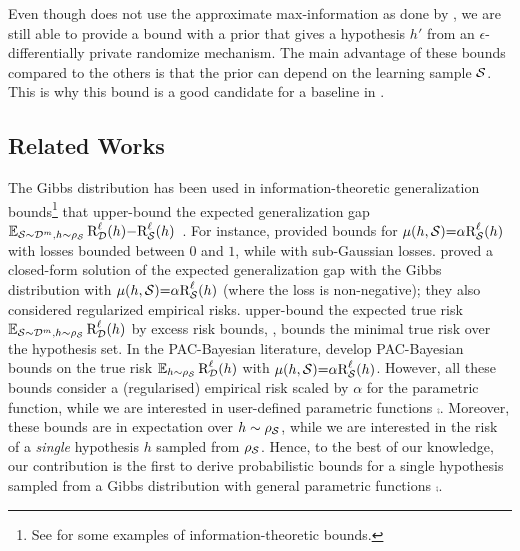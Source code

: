 \documentclass[twoside]{article}
\theoremstyle{plain}
\begin{document}
Even though  does not use the approximate max-information as done by \citet{dziugaite2018data}, we are still able to provide a bound with a prior that gives a hypothesis $h'$ from an $\epsilon$-differentially private randomize mechanism.
The main advantage of these bounds compared to the others is that the prior can depend on the learning sample $\mathcal{S}$. 
This is why this bound is a good candidate for a baseline in .

\subsection{Related Works}
\label{sec:related-works}

The Gibbs distribution has been used in information-theoretic generalization bounds\footnote{See \citet{xu2017information,goyal2017pac,bu2020tightening} for some examples of information-theoretic bounds.} that upper-bound the expected generalization gap $\operatorname*{\mathbb{E}}_{\mathcal{S}\sim\mathcal{D}^m, h\sim\rho_{\mathcal{S}}}\text{R}^{\ell}_{\mathcal{D}}(h){-}\text{R}^{\ell}_{\mathcal{S}}(h)$~.
For instance, \citet[Theorem 4,][]{raginsky2016information} provided  bounds for $\operatorname{\mu}(h,\mathcal{S}){=}\alpha\text{R}^{\ell}_{\mathcal{S}}(h)$ with losses bounded between $0$ and $1$, while \citet[Theorem 1,][]{kuzborskij2019distribution} with sub-Gaussian losses.
\citet[Theorem 1,][]{aminian2021exact} proved a closed-form solution of the expected generalization gap with the Gibbs distribution with $\operatorname{\mu}(h,\mathcal{S}){=}\alpha\text{R}^{\ell}_{\mathcal{S}}(h)$ (where the loss is non-negative); they also considered regularized empirical risks.
\citet{xu2017information,kuzborskij2019distribution} upper-bound the expected true risk $\operatorname*{\mathbb{E}}_{\mathcal{S}\sim\mathcal{D}^m, h\sim\rho_{\mathcal{S}}}\text{R}^{\ell}_{\mathcal{D}}(h)$ by excess risk bounds, \ie, bounds \wrt the minimal true risk over the hypothesis set.
In the PAC-Bayesian literature, \citet{alquier2016properties} develop PAC-Bayesian bounds on the true risk $\operatorname*{\mathbb{E}}_{h\sim\rho_{\mathcal{S}}}\text{R}^{\ell}_{\mathcal{D}}(h)$ with $\operatorname{\mu}(h,\mathcal{S}){=}\alpha\text{R}^{\ell}_{\mathcal{S}}(h)$.
However, all these bounds consider a (regularised) empirical risk scaled by $\alpha$ for the parametric function, while we are interested in user-defined parametric functions $\comp$.
Moreover, these bounds are in expectation over $h\sim\rho_{\mathcal{S}}$, while we are interested in the risk of a {\it single} hypothesis $h$ sampled from $\rho_{\mathcal{S}}$.
Hence, to the best of our knowledge, our contribution is the first to derive probabilistic bounds for a single hypothesis sampled from a Gibbs distribution with general parametric functions $\comp$.
\end{document}
